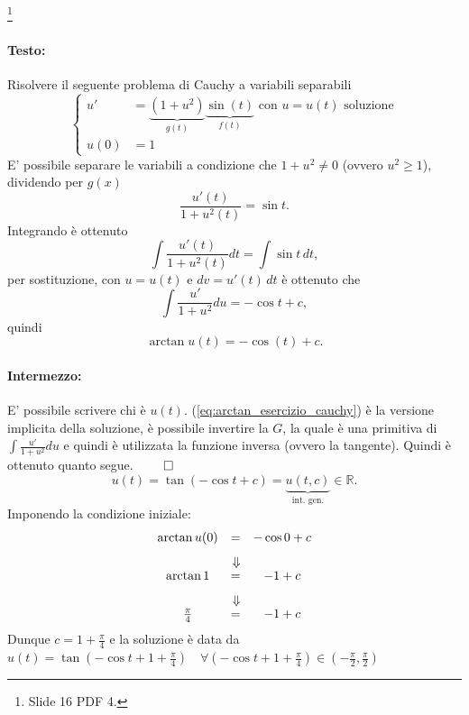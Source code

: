 \begin{example}\footnote{Slide 16 PDF 4.}
    \paragraph{Testo:} Risolvere il seguente problema di Cauchy a variabili separabili
    \begin{equation*}
        \begin{cases}
            u' &= \underbrace{(1+u^2)}_{g(t)}\underbrace{\sin(t)}_{f(t)} \text{ con } u=u(t) \text{ soluzione}\\
            u(0) &= 1
        \end{cases}
    \end{equation*}
    E' possibile separare le variabili a condizione che $1+u^2\neq 0$ (ovvero $u^2\geq1$), dividendo per $g(x)$
    \begin{equation*}
        \frac{u'(t)}{1+u^2(t)} = \sin t.
    \end{equation*}
    Integrando è ottenuto
    \begin{equation*}
        \int \frac{u'(t)}{1+u^2(t)}dt = \int\sin t \,dt,
    \end{equation*}
    per sostituzione, con $u=u(t)$ e $dv=u'(t)\,dt$ è ottenuto che
    \begin{equation*}
        \int \frac{u'}{1+u^2}du = -\cos t + c,
    \end{equation*}
    quindi
    \begin{equation}\label{eq:arctan_esercizio_cauchy}
        \arctan u(t) = -\cos(t) + c.
    \end{equation}
    \paragraph{Intermezzo:} E' possibile scrivere chi è $u(t)$. (\ref{eq:arctan_esercizio_cauchy}) è la versione implicita della soluzione, è possibile invertire la $G$, la quale è una primitiva di $\int \frac{u'}{1+u^2}du$ e quindi è utilizzata la funzione inversa (ovvero la tangente). Quindi è ottenuto quanto segue. $\qed$
    \begin{equation*}
        u(t) = \tan(-\cos t + c)= \underbrace{u(t, c)}_\text{int. gen.}\in\mathbb R.
    \end{equation*}
    Imponendo la condizione iniziale:
    \begin{equation*}
       \begin{matrix}
            \arctan u(0) &=& -\cos 0 + c\\
            &\Vertrarrow&\\
            \arctan 1 &=& -1 + c\\
            &\Vertrarrow&\\
            \frac{\pi}{4} &=& -1 + c
       \end{matrix}
    \end{equation*}
    Dunque $c=1+\frac{\pi}{4}$ e la soluzione è data da $u(t)=\tan(-\cos t + 1 + \frac{\pi}{4})\quad \forall(-\cos t + 1 + \frac{\pi}{4})\in(-\frac{\pi}{2}, \frac{\pi}{2})$
\end{example}


